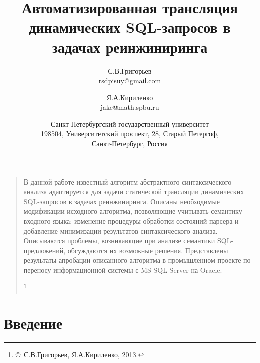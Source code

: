 \documentclass[a5paper]{article}
\title{Автоматизированная трансляция динамических SQL-запросов в задачах реинжиниринга}
\author{С.В.Григорьев\\
rsdpisuy@gmail.com\\
\and
Я.А.Кириленко\\
jake@math.spbu.ru\\
\and Санкт-Петербургский государственный университет\\
198504, Университетский проспект, 28, Старый Петергоф,\\
Санкт-Петербург, Россия}
\date{}
\begin{document}
\maketitle
\thispagestyle{empty}

\begin{quote}
\small\noindent В данной работе известный алгоритм абстрактного синтаксического анализа адаптируется для  задачи статической трансляции динамических SQL-запросов в задачах реинжиниринга. Описаны необходимые модификации исходного алгоритма, позволяющие учитывать семантику входного языка: изменение процедуры обработки состояний парсера и добавление минимизации результатов синтаксического анализа. Описываются проблемы, возникающие при анализе  семантики SQL-предложений,  обсуждаются их возможные решения. Представлены результаты апробации описанного алгоритма в промышленном проекте по переносу информационной системы с MS-SQL Server на Oracle.


\renewcommand{\thefootnote}{}

\footnote{\small{\copyright~С.В.Григорьев, Я.А.Кириленко, 2013.}}
\renewcommand{\thefootnote}{\arabic{footnote}}
\setcounter{footnote}{0}
\end{quote}

\section*{Введение}
\end{document}
